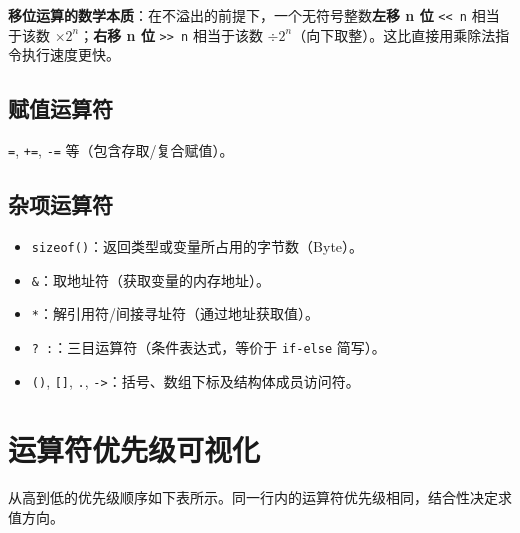 \textbf{移位运算的数学本质}：在不溢出的前提下，一个无符号整数\textbf{左移 n 位} \texttt{<< n} 相当于该数 $\times 2^n$；\textbf{右移 n 位} \texttt{>> n} 相当于该数 $\div 2^n$（向下取整）。这比直接用乘除法指令执行速度更快。

\subsection{赋值运算符}

\texttt{=}, \texttt{+=}, \texttt{-=} 等（包含存取/复合赋值）。

\subsection{杂项运算符}

\begin{itemize}
    \item \texttt{sizeof()}：返回类型或变量所占用的字节数（Byte）。
    \item \texttt{\&}：取地址符（获取变量的内存地址）。
    \item \texttt{*}：解引用符/间接寻址符（通过地址获取值）。
    \item \texttt{? :}：三目运算符（条件表达式，等价于 \texttt{if-else} 简写）。
    \item \texttt{()}, \texttt{[]}, \texttt{.}, \texttt{->}：括号、数组下标及结构体成员访问符。
\end{itemize}

\section{运算符优先级可视化}

从高到低的优先级顺序如下表所示。同一行内的运算符优先级相同，结合性决定求值方向。

